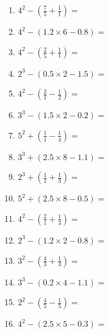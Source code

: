 \documentclass[12pt]{article}
\begin{document}
\begin{enumerate}
\item \large $ 4^{2} - (\frac{7}{5} + \frac{1}{1}) = $ \vspace{1.6cm}
\item \large $ 4^{2} - (1.2 \times 6 - 0.8) = $ \vspace{1.6cm}
\item \large $ 4^{2} - (\frac{2}{5} + \frac{1}{1}) = $ \vspace{1.6cm}
\item \large $ 2^{3} - (0.5 \times 2 - 1.5) = $ \vspace{1.6cm}
\item \large $ 4^{2} - (\frac{2}{1} - \frac{1}{2}) = $ \vspace{1.6cm}
\item \large $ 3^{3} - (1.5 \times 2 - 0.2) = $ \vspace{1.6cm}
\newpage
\item \large $ 5^{2} + (\frac{1}{1} - \frac{1}{4}) = $ \vspace{1.6cm}
\item \large $ 3^{3} + (2.5 \times 8 - 1.1) = $ \vspace{1.6cm}
\item \large $ 2^{3} + (\frac{1}{1} + \frac{1}{3}) = $ \vspace{1.6cm}
\item \large $ 5^{2} + (2.5 \times 8 - 0.5) = $ \vspace{1.6cm}
\item \large $ 4^{2} - (\frac{2}{1} + \frac{1}{3}) = $ \vspace{1.6cm}
\item \large $ 2^{3} - (1.2 \times 2 - 0.8) = $ \vspace{1.6cm}
\item \large $ 3^{2} - (\frac{4}{3} + \frac{1}{3}) = $ \vspace{1.6cm}
\item \large $ 3^{3} - (0.2 \times 4 - 1.1) = $ \vspace{1.6cm}
\item \large $ 2^{2} - (\frac{4}{5} - \frac{1}{5}) = $ \vspace{1.6cm}
\item \large $ 4^{2} - (2.5 \times 5 - 0.3) = $ \vspace{1.6cm}
\end{enumerate}\newpage
\end{document}
